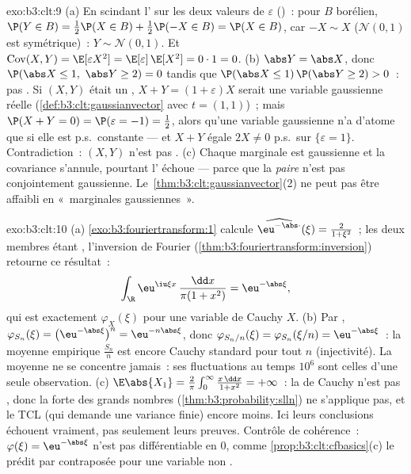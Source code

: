 \begin{solution}{exo:b3:clt:9}
(a) En scindant l' sur les deux valeurs de
$\varepsilon$ ()~: pour $B$ borélien, $\P(Y \in
B) = \frac12\P(X \in B) + \frac12\P(-X \in B) = \P(X \in
B)$, car $-X \sim X$ ($\mathcal N(0,1)$ est symétrique)~: $Y
\sim \mathcal N(0,1)$. Et $\operatorname{Cov}(X, Y) =
\E[\varepsilon X^2] = \E[\varepsilon]\,\E[X^2] = 0 \cdot 1 =
0$.
(b) $\abs Y = \abs X$, donc $\P(\abs X \leq 1,\ \abs Y \geq
2) = 0$ tandis que $\P(\abs X \leq 1)\,\P(\abs Y \geq 2) >
0$~: pas . Si $(X, Y)$ était un , $X + Y = (1 + \varepsilon)X$ serait une variable
gaussienne réelle (\cref{def:b3:clt:gaussianvector} avec $t =
(1,1)$)~; mais $\P(X + Y = 0) = \P(\varepsilon = -1) =
\frac12$, alors qu'une variable gaussienne n'a d'atome que
si elle est p.s.\ constante --- et $X + Y$ égale $2X \neq 0$
p.s.\ sur $\{\varepsilon = 1\}$. Contradiction~: $(X, Y)$
n'est pas .
(c) Chaque marginale est gaussienne et la covariance
s'annule, pourtant l' échoue --- parce que la
\emph{paire} n'est pas conjointement gaussienne.
Le~\cref{thm:b3:clt:gaussianvector}(2) ne peut pas être
affaibli en «~marginales gaussiennes~».
\end{solution}

\begin{solution}{exo:b3:clt:10}
(a) \cref{exo:b3:fouriertransform:1} calcule
$\widehat{\eu^{-\abs\cdot}}(\xi) = \frac{2}{1 + \xi^2}$~;
les deux membres étant , l'inversion de Fourier
(\cref{thm:b3:fouriertransform:inversion}) retourne ce
résultat~:
\[
\int_\R\eu^{\iu\xi x}\,\frac{\dd x}{\pi(1 + x^2)} =
\eu^{-\abs\xi},
\]
qui est exactement $\varphi_X(\xi)$ pour une variable de
Cauchy $X$.
(b) Par , $\varphi_{S_n}(\xi) =
\bigl(\eu^{-\abs\xi}\bigr)^n = \eu^{-n\abs\xi}$, donc
$\varphi_{S_n/n}(\xi) = \varphi_{S_n}(\xi/n) =
\eu^{-\abs\xi}$~: la moyenne empirique $\frac{S_n}n$ est
encore Cauchy standard pour tout $n$ (injectivité). La
moyenne ne se concentre jamais~: ses fluctuations au temps
$10^6$ sont celles d'une seule observation.
(c) $\E\abs{X_1} = \frac2\pi\int_0^\infty\frac{x\,\dd x}{1 +
x^2} = +\infty$~: la  de Cauchy n'est pas ,
donc la  forte des grands nombres
(\cref{thm:b3:probability:slln}) ne s'applique pas, et le
TCL (qui demande une variance finie) encore moins. Ici leurs
conclusions échouent vraiment, pas seulement leurs preuves.
Contrôle de cohérence~: $\varphi(\xi) = \eu^{-\abs\xi}$
n'est pas différentiable en $0$, comme
\cref{prop:b3:clt:cfbasics}(c) le prédit par contraposée
pour une variable non .
\end{solution}


